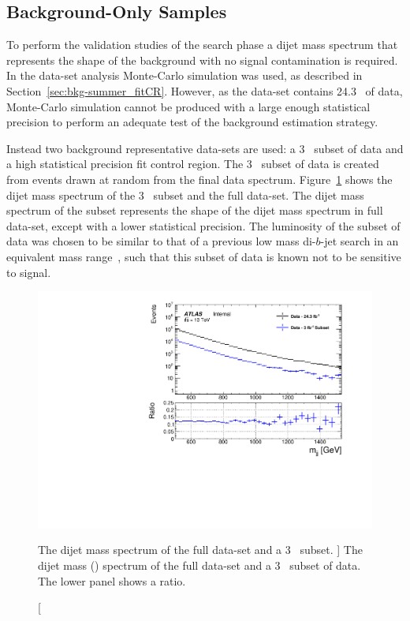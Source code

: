 \subsection{Background-Only Samples}
\label{sec:bkg-full_fitCR}


To perform the validation studies of the \lm{} search phase
a dijet mass spectrum that represents the shape of the background with no signal contamination is required.
In the \summer{} data-set analysis Monte-Carlo simulation was used,
as described in Section~\ref{sec:bkg-summer_fitCR}.
However, as the \lm{} data-set contains 24.3~\ifb{} of data, Monte-Carlo simulation cannot be produced with a large enough statistical
precision to perform an adequate test of the background estimation strategy.

Instead two background representative data-sets are used:
a 3~\ifb{} subset of data and a high statistical precision fit control region.
The 3~\ifb{} subset of data is created from events drawn at random from the final data spectrum.
Figure~\ref{fig:fittingDataSubset} shows the dijet mass spectrum of the 3~\ifb{} subset and the full \lm{} data-set.
The dijet mass spectrum of the subset represents the shape of the dijet mass spectrum in full data-set,
except with a lower statistical precision.
The luminosity of the subset of data was chosen to be similar to that of a
previous low mass di-$b$-jet search in an equivalent mass range~\cite{dibjet-lhcp_conf},
such that this subset of data is known not to be sensitive to signal.

\begin{figure}[!htb]
\captionsetup[subfigure]{aboveskip=0pt,justification=centering}
\centering
\includegraphics[width=0.7\linewidth, angle=0]{figs/Dibjet/LowMass/FitStudy/subset_dataComp.pdf}
\vspace{-1em}
\caption
    [ The dijet mass spectrum of the full \lm{} data-set and a 3~\ifb{} subset.
      ]
    {\label{fig:fittingDataSubset}
      The dijet mass (\mjj{}) spectrum of the full \lm{} data-set and a 3~\ifb{} subset of \lm{} data.
      The lower panel shows a ratio.}
    \vspace{-1em}
\end{figure}


